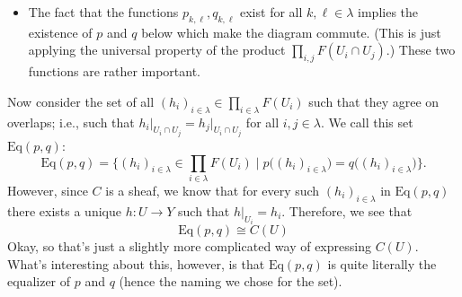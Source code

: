 \begin{itemize}
\begin{center}
    \end{center}
    \item  
    The fact that the functions $p_{k, \ell}, q_{k, \ell}$ exist for all $k, \ell \in \lambda$ implies 
    the existence of $p$ and $q$ below which make the diagram commute. (This 
    is just applying the universal property of the product $\prod_{i, j}F(U_i \cap U_j)$.)
    These two functions are rather important.
    \begin{center}
    \end{center}
\end{itemize}

Now consider the set of all $(h_i)_{i \in \lambda} \in \prod_{i \in \lambda}F(U_i)$ 
such that they agree on overlaps; i.e., such that $h_i\big|_{U_i \cap U_j} = 
h_j\big|_{U_i \cap U_j}$ for all $i, j \in \lambda$. We call this set $\text{Eq}(p,  q)$:
\[
    \text{Eq}(p, q) = \Big\{ (h_i)_{i \in \lambda} \in \prod_{i \in \lambda}F(U_i) \mid p\Big( (h_i)_{i \in \lambda} \Big) = q\Big( (h_i)_{i \in \lambda} \Big) \Big\}.
\]
However, since $C$ is a sheaf, we know that for every such $(h_i)_{i \in \lambda}$ in $\text{Eq}(p, q)$
there exists a unique $h: U \to Y$ such that $h|_{U_i} = h_i$. Therefore, we see 
that 
\[
    \text{Eq}(p, q) \cong C(U)
\]
Okay, so that's just a slightly more complicated way of expressing $C(U)$. 
What's interesting about this, however, is that $\text{Eq}(p, q)$ is quite literally 
the equalizer of $p$ and $q$ (hence the naming we chose for the set).
\begin{center}
\end{center}

